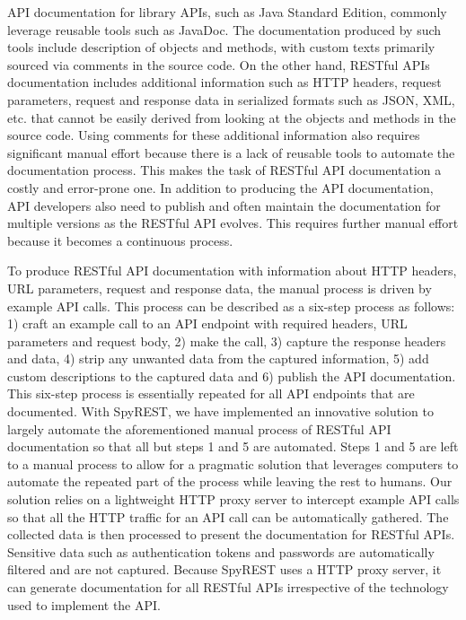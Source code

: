 \documentclass[conference]{IEEEtran}
\begin{document}
API documentation for library APIs, such as Java Standard Edition, commonly leverage reusable tools such as JavaDoc. The documentation produced by such tools include description of objects and methods, with custom texts primarily sourced via comments in the source code. On the other hand, RESTful APIs documentation includes additional information such as HTTP headers, request parameters, request and response data in serialized formats such as JSON, XML, etc. that cannot be easily derived from looking at the objects and methods in the source code. Using comments for these additional information also requires significant manual effort because there is a lack of reusable tools to automate the documentation process. This makes the task of RESTful API documentation a costly and error-prone one. In addition to producing the API documentation, API developers also need to publish and often maintain the documentation for multiple versions as the RESTful API evolves. This requires further manual effort because it becomes a continuous process.

To produce RESTful API documentation with information about HTTP headers, URL parameters, request and response data, the manual process is driven by example API calls. This process can be described as a six-step process as follows: 1) craft an example call to an API endpoint with required headers, URL parameters and request body, 2) make the call, 3) capture the response headers and data, 4) strip any unwanted data from the captured information, 5) add custom descriptions to the captured data and 6) publish the API documentation. This six-step process is essentially repeated for all API endpoints that are documented. With SpyREST, we have implemented an innovative solution to largely automate the aforementioned manual process of RESTful API documentation so that all but steps 1 and 5 are automated. Steps 1 and 5 are left to a manual process to allow for a pragmatic solution that leverages computers to automate the repeated part of the process while leaving the rest to humans. Our solution relies on a lightweight HTTP proxy server to intercept example API calls so that all the HTTP traffic for an API call can be automatically gathered. The collected data is then processed to present the documentation for RESTful APIs. Sensitive data such as authentication tokens and passwords are automatically filtered and are not captured. Because SpyREST uses a HTTP proxy server, it can generate documentation for all RESTful APIs irrespective of the technology used to implement the API.
\end{document}
